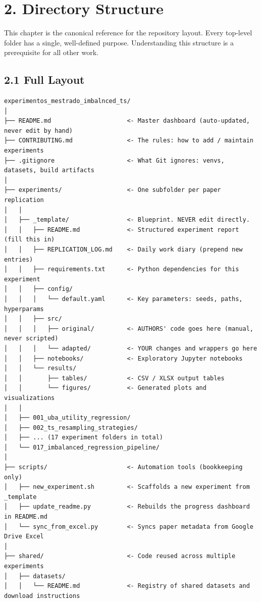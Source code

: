 \section{2. Directory Structure}\label{directory-structure}

This chapter is the canonical reference for the repository layout. Every
top-level folder has a single, well-defined purpose. Understanding this
structure is a prerequisite for all other work.

\subsection{2.1 Full Layout}\label{full-layout}

\begin{verbatim}
experimentos_mestrado_imbalnced_ts/
│
├── README.md                     <- Master dashboard (auto-updated, never edit by hand)
├── CONTRIBUTING.md               <- The rules: how to add / maintain experiments
├── .gitignore                    <- What Git ignores: venvs, datasets, build artifacts
│
├── experiments/                  <- One subfolder per paper replication
│   │
│   ├── _template/                <- Blueprint. NEVER edit directly.
│   │   ├── README.md             <- Structured experiment report (fill this in)
│   │   ├── REPLICATION_LOG.md    <- Daily work diary (prepend new entries)
│   │   ├── requirements.txt      <- Python dependencies for this experiment
│   │   ├── config/
│   │   │   └── default.yaml      <- Key parameters: seeds, paths, hyperparams
│   │   ├── src/
│   │   │   ├── original/         <- AUTHORS' code goes here (manual, never scripted)
│   │   │   └── adapted/          <- YOUR changes and wrappers go here
│   │   ├── notebooks/            <- Exploratory Jupyter notebooks
│   │   └── results/
│   │       ├── tables/           <- CSV / XLSX output tables
│   │       └── figures/          <- Generated plots and visualizations
│   │
│   ├── 001_uba_utility_regression/
│   ├── 002_ts_resampling_strategies/
│   ├── ... (17 experiment folders in total)
│   └── 017_imbalanced_regression_pipeline/
│
├── scripts/                      <- Automation tools (bookkeeping only)
│   ├── new_experiment.sh         <- Scaffolds a new experiment from _template
│   ├── update_readme.py          <- Rebuilds the progress dashboard in README.md
│   └── sync_from_excel.py        <- Syncs paper metadata from Google Drive Excel
│
├── shared/                       <- Code reused across multiple experiments
│   ├── datasets/
│   │   └── README.md             <- Registry of shared datasets and download instructions

\end{verbatim}
